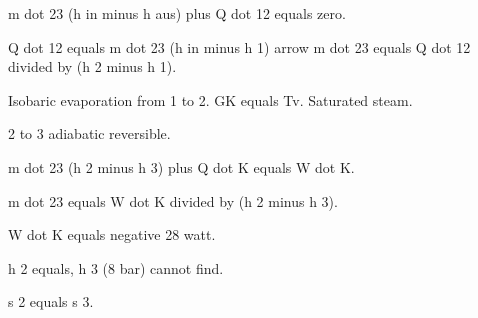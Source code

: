m dot 23 (h in minus h aus) plus Q dot 12 equals zero.

Q dot 12 equals m dot 23 (h in minus h 1) arrow m dot 23 equals Q dot 12 divided by (h 2 minus h 1).

Isobaric evaporation from 1 to 2. GK equals Tv. Saturated steam.

2 to 3 adiabatic reversible.

m dot 23 (h 2 minus h 3) plus Q dot K equals W dot K.

m dot 23 equals W dot K divided by (h 2 minus h 3).

W dot K equals negative 28 watt.

h 2 equals, h 3 (8 bar) cannot find.

s 2 equals s 3.